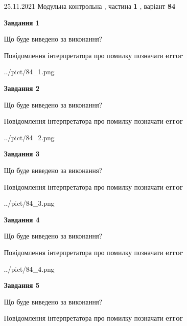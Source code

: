 \documentclass[10pt, ukrainian]{article}
\begin{document}
{25.11.2021 Модульна контрольна , частина \textbf { 1 }, варіант  \No \textbf { 84 }\par}
{
\begin {large}

{\begin {center}\textbf{Завдання 1}\end {center}}\par
Що буде виведено за виконання? \par
Повідомлення інтерпретатора про помилку позначати \textbf{error}

\begin{center}
	{../pict/84_1.png}
\end{center}
\newpage

{\begin {center}\textbf{Завдання 2}\end {center}}\par
Що буде виведено за виконання? \par
Повідомлення інтерпретатора про помилку позначати \textbf{error}

\begin{center}
	{../pict/84_2.png}
\end{center}
\newpage

{\begin {center}\textbf{Завдання 3}\end {center}}\par
Що буде виведено за виконання? \par
Повідомлення інтерпретатора про помилку позначати \textbf{error}

\begin{center}
	{../pict/84_3.png}
\end{center}
\newpage

{\begin {center}\textbf{Завдання 4}\end {center}}\par
Що буде виведено за виконання? \par
Повідомлення інтерпретатора про помилку позначати \textbf{error}

\begin{center}
	{../pict/84_4.png}
\end{center}
\newpage

{\begin {center}\textbf{Завдання 5}\end {center}}\par
Що буде виведено за виконання? \par
Повідомлення інтерпретатора про помилку позначати \textbf{error}


\end{large}}
\end{document}
